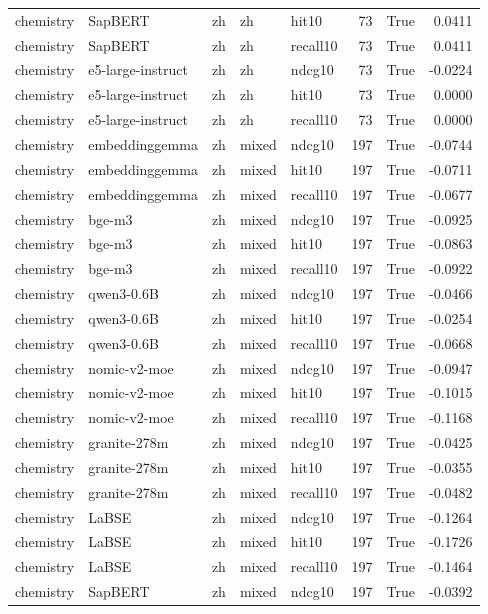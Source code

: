 \begin{tabular}{lllllrrr}
chemistry & SapBERT & zh & zh & hit10 & 73 & True & 0.0411 \\
chemistry & SapBERT & zh & zh & recall10 & 73 & True & 0.0411 \\
chemistry & e5-large-instruct & zh & zh & ndcg10 & 73 & True & -0.0224 \\
chemistry & e5-large-instruct & zh & zh & hit10 & 73 & True & 0.0000 \\
chemistry & e5-large-instruct & zh & zh & recall10 & 73 & True & 0.0000 \\
chemistry & embeddinggemma & zh & mixed & ndcg10 & 197 & True & -0.0744 \\
chemistry & embeddinggemma & zh & mixed & hit10 & 197 & True & -0.0711 \\
chemistry & embeddinggemma & zh & mixed & recall10 & 197 & True & -0.0677 \\
chemistry & bge-m3 & zh & mixed & ndcg10 & 197 & True & -0.0925 \\
chemistry & bge-m3 & zh & mixed & hit10 & 197 & True & -0.0863 \\
chemistry & bge-m3 & zh & mixed & recall10 & 197 & True & -0.0922 \\
chemistry & qwen3-0.6B & zh & mixed & ndcg10 & 197 & True & -0.0466 \\
chemistry & qwen3-0.6B & zh & mixed & hit10 & 197 & True & -0.0254 \\
chemistry & qwen3-0.6B & zh & mixed & recall10 & 197 & True & -0.0668 \\
chemistry & nomic-v2-moe & zh & mixed & ndcg10 & 197 & True & -0.0947 \\
chemistry & nomic-v2-moe & zh & mixed & hit10 & 197 & True & -0.1015 \\
chemistry & nomic-v2-moe & zh & mixed & recall10 & 197 & True & -0.1168 \\
chemistry & granite-278m & zh & mixed & ndcg10 & 197 & True & -0.0425 \\
chemistry & granite-278m & zh & mixed & hit10 & 197 & True & -0.0355 \\
chemistry & granite-278m & zh & mixed & recall10 & 197 & True & -0.0482 \\
chemistry & LaBSE & zh & mixed & ndcg10 & 197 & True & -0.1264 \\
chemistry & LaBSE & zh & mixed & hit10 & 197 & True & -0.1726 \\
chemistry & LaBSE & zh & mixed & recall10 & 197 & True & -0.1464 \\
chemistry & SapBERT & zh & mixed & ndcg10 & 197 & True & -0.0392 \\

\end{tabular}
